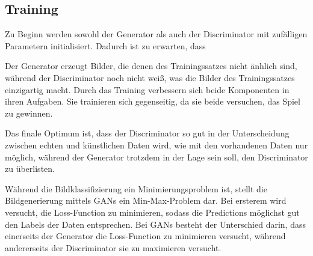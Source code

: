 


\subsection{Training}
Zu Beginn werden sowohl der Generator als auch der Discriminator mit zufälligen Parametern initialisiert. Dadurch ist zu erwarten, dass 


Der Generator erzeugt Bilder, die denen des Trainingssatzes nicht änhlich sind, während der Discriminator noch nicht weiß, was die Bilder des Trainingssatzes einzigartig macht. Durch das Training verbessern sich beide Komponenten in ihren Aufgaben. Sie trainieren sich gegenseitig, da sie beide versuchen, das Spiel zu gewinnen.

Das finale Optimum ist, dass der Discriminator so gut in der Unterscheidung zwischen echten und künstlichen Daten wird, wie mit den vorhandenen Daten nur möglich, während der Generator trotzdem in der Lage sein soll, den Discriminator zu überlisten. \cite[S. 656]{visualApproach}

Während die Bildklassifizierung ein Minimierungsproblem ist, stellt die Bildgenerierung mittels \acp{GAN} ein Min-Max-Problem dar. Bei ersterem wird versucht, die Loss-Function zu minimieren, sodass die Predictions möglichst gut den Labels der Daten entsprechen. Bei \acp{GAN} besteht der Unterschied darin, dass einerseits der Generator die Loss-Function zu minimieren versucht, während andererseits der Discriminator sie zu maximieren versucht.

